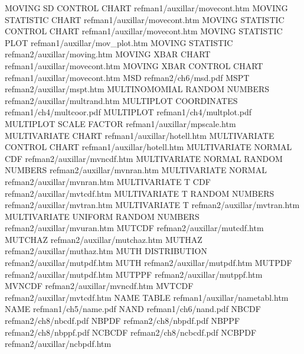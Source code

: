 MOVING SD CONTROL CHART                 refman1/auxillar/movecont.htm
MOVING STATISTIC CHART                  refman1/auxillar/movecont.htm
MOVING STATISTIC CONTROL CHART          refman1/auxillar/movecont.htm
MOVING STATISTIC PLOT                   refman1/auxillar/mov_plot.htm
MOVING STATISTIC                        refman2/auxillar/moving.htm
MOVING XBAR CHART                       refman1/auxillar/movecont.htm
MOVING XBAR CONTROL CHART               refman1/auxillar/movecont.htm
MSD                                     refman2/ch6/msd.pdf
MSPT                                    refman2/auxillar/mspt.htm
MULTINOMOMIAL RANDOM NUMBERS            refman2/auxillar/multrand.htm
MULTIPLOT COORDINATES                   refman1/ch4/multcoor.pdf
MULTIPLOT                               refman1/ch4/multplot.pdf
MULTIPLOT SCALE FACTOR                  refman1/auxillar/mpscale.htm
MULTIVARIATE CHART                      refman1/auxillar/hotell.htm
MULTIVARIATE CONTROL CHART              refman1/auxillar/hotell.htm
MULTIVARIATE NORMAL CDF                 refman2/auxillar/mvncdf.htm
MULTIVARIATE NORMAL RANDOM NUMBERS      refman2/auxillar/mvnran.htm
MULTIVARIATE NORMAL                     refman2/auxillar/mvnran.htm
MULTIVARIATE T CDF                      refman2/auxillar/mvtcdf.htm
MULTIVARIATE T RANDOM NUMBERS           refman2/auxillar/mvtran.htm
MULTIVARIATE T                          refman2/auxillar/mvtran.htm
MULTIVARIATE UNIFORM RANDOM NUMBERS     refman2/auxillar/mvuran.htm
MUTCDF                                  refman2/auxillar/mutcdf.htm
MUTCHAZ                                 refman2/auxillar/mutchaz.htm
MUTHAZ                                  refman2/auxillar/muthaz.htm
MUTH DISTRIBUTION                       refman2/auxillar/mutpdf.htm
MUTH                                    refman2/auxillar/mutpdf.htm
MUTPDF                                  refman2/auxillar/mutpdf.htm
MUTPPF                                  refman2/auxillar/mutppf.htm
MVNCDF                                  refman2/auxillar/mvncdf.htm
MVTCDF                                  refman2/auxillar/mvtcdf.htm
NAME TABLE                              refman1/auxillar/nametabl.htm
NAME                                    refman1/ch5/name.pdf
NAND                                    refman1/ch6/nand.pdf
NBCDF                                   refman2/ch8/nbcdf.pdf
NBPDF                                   refman2/ch8/nbpdf.pdf
NBPPF                                   refman2/ch8/nbppf.pdf
NCBCDF                                  refman2/ch8/ncbcdf.pdf
NCBPDF                                  refman2/auxillar/ncbpdf.htm
